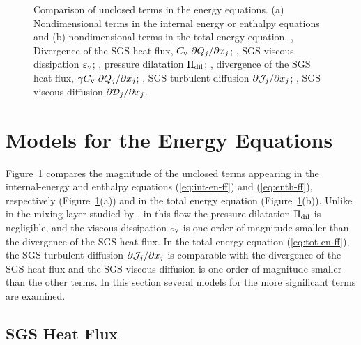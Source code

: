 \documentclass[tcfd]{svjour}
\begin{document}
\begin{figure}[t]
\vspace{90mm}%
\caption{Comparison of unclosed terms in the energy equations. (a)
Nondimensional terms in the internal energy or enthalpy equations and (b) nondimensional terms
in the total energy equation. \solid, Divergence of the SGS heat f\/lux, $C_{\rm v}\ \partial
Q_j/\partial x_j$; \chndot, SGS viscous dissipation $\varepsilon_{\rm v}$; \dashed, pressure
dilatation $\Pi_{\rm dil}$; \chndotdot, divergence of the SGS heat f\/lux, $\gamma C_{\rm
v}\ \partial Q_j/\partial x_j$; \dotted, SGS turbulent diffusion $\partial{\cal J}_j/\partial
x_j$; \ldash, SGS viscous diffusion $\partial{\cal D}_j/\partial x_j$.}
\label{fig:fig05}
\end{figure}


\section{Models for the Energy Equations}
\label{sec:5}

Figure~\ref{fig:fig05} compares the magnitude of the unclosed terms
appearing in the internal-energy and enthalpy equations
(\ref{eq:int-en-ff}) and (\ref{eq:enth-ff}), respectively (Figure~\ref{fig:fig05}(a)) and
in the total energy equation (Figure~\ref{fig:fig05}(b)). Unlike in the mixing layer
studied by \citet{vre95b}, in this f\/low the pressure
dilatation $\Pi_{\rm dil}$ is negligible, and the viscous dissipation
$\varepsilon_{\rm v}$ is one order of magnitude smaller than the divergence of
the SGS heat f\/lux. In the total energy equation (\ref{eq:tot-en-ff}),
the SGS turbulent diffusion $\partial{\cal J}_j/\partial x_j$ is
comparable with the divergence of the SGS heat f\/lux and the SGS viscous
diffusion is one order of magnitude smaller than the other terms. In
this section several models for the more signif\/icant terms are examined.


\subsection{SGS Heat Flux}
\label{sec:5.1}
\end{document}
